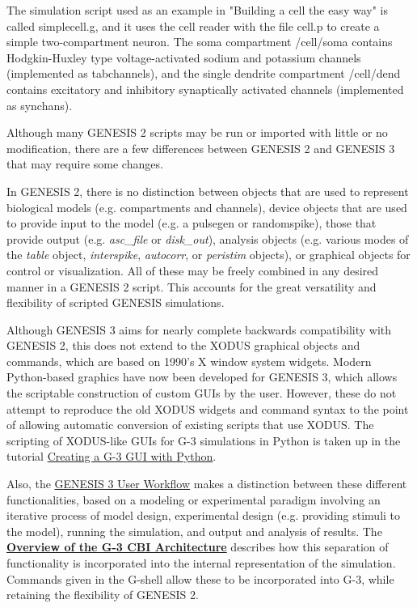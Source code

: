 \documentclass[12pt]{article}
\begin{document}
The simulation script used as an example in "Building a cell the easy
way" is called simplecell.g, and it uses the cell reader with the file
cell.p to create a simple two-compartment neuron.  The soma
compartment /cell/soma contains Hodgkin-Huxley type voltage-activated
sodium and potassium channels (implemented as tabchannels), and the single
dendrite compartment /cell/dend contains excitatory and inhibitory
synaptically activated channels (implemented as synchans).

Although many GENESIS 2 scripts may be run or imported with little or no
modification, there are a few differences between GENESIS 2 and GENESIS 3
that may require some changes.

In GENESIS 2, there is no distinction between objects that are used to
represent biological models (e.g. compartments and channels), device
objects that are used to provide input to the model (e.g. a pulsegen or
randomspike), those that provide output (e.g. {\it asc\_file} or {\it disk\_out}),
analysis objects (e.g. various modes of the {\it table} object, {\it interspike},
{\it autocorr}, or {\it peristim} objects), or graphical objects for control or
visualization.  All of these may be freely combined in any desired
manner in a GENESIS 2 script.  This accounts for the great versatility
and flexibility of scripted GENESIS simulations.

Although GENESIS 3 aims for nearly complete backwards compatibility
with GENESIS 2, this does not extend to the XODUS graphical objects and
commands, which are based on 1990's X window system widgets.  Modern
Python-based graphics have now been developed for GENESIS 3, which
allows the scriptable construction of custom GUIs by the user.
However, these do not attempt to reproduce the old XODUS
widgets and command syntax to the point of allowing automatic conversion of
existing scripts that use XODUS.  The scripting of XODUS-like GUIs for G-3
simulations in Python is taken up in the tutorial
\href{../tutorial-python-gui/tutorial-python-gui.html}{Creating a G-3 GUI
with Python}.

Also, the \href{../workflow-user/workflow-user.html}{GENESIS 3 User Workflow} makes a distinction
between these different functionalities, based on a modeling or experimental paradigm involving an
iterative process of model design, experimental design (e.g. providing stimuli to the model),
running the simulation, and output and analysis of results.  The
\href{../genesis-overview/genesis-overview.tex}{\bf Overview of the G-3 CBI Architecture}
describes how this separation of functionality is incorporated into the
internal representation of the simulation.  Commands given in the G-shell
allow these to be incorporated into G-3, while retaining the flexibility of
GENESIS 2.
\end{document}
